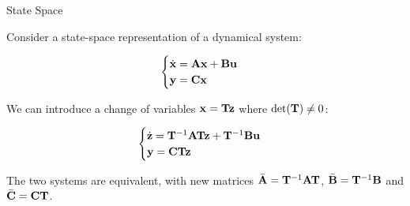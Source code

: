 \documentclass{beamer}
\begin{document}
\begin{frame}{State Space}
	\begin{flushleft}
		
		Consider a state-space representation of a dynamical system:
		
		\begin{equation}
			\begin{cases}
				\dot{\mathbf{x}} = \mathbf{A}\mathbf{x}+\mathbf{B}\mathbf{u} 
				\\
				\mathbf{y} = \mathbf{C}\mathbf{x}
			\end{cases}
		\end{equation}
		
		We can introduce a change of variables $\mathbf{x} = \mathbf{T}\mathbf{z}$ where $\text{det}(\mathbf{T}) \neq 0$:
		
		\begin{equation}
			\begin{cases}
				\dot{\mathbf{z}} = \mathbf{T}^{-1}\mathbf{A}\mathbf{T} \mathbf{z}+\mathbf{T}^{-1}\mathbf{B}\mathbf{u} 
				\\
				\mathbf{y} = \mathbf{C}\mathbf{T}\mathbf{z}
			\end{cases}
		\end{equation}
		
		The two systems are equivalent, with new matrices $\bar{\mathbf{A}} = \mathbf{T}^{-1}\mathbf{A}\mathbf{T}$, $\bar{\mathbf{B}} = \mathbf{T}^{-1}\mathbf{B}$ and $\bar{\mathbf{C}} = \mathbf{C}\mathbf{T}$.
		
	\end{flushleft}
\end{frame}
\end{document}
